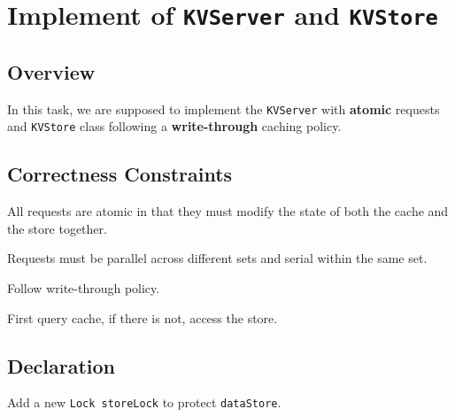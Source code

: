 \documentclass{article}
\begin{document}
\section{Implement of \texttt{KVServer} and \texttt{KVStore}}
\subsection{Overview}
In this task, we are supposed to implement the \texttt{KVServer} with \textbf{atomic} requests
and \texttt{KVStore} class following a \textbf{write-through} caching policy.
\subsection{Correctness Constraints}
\begin{compactitem}
	\item All requests are atomic in that they must modify the state of both the cache and the store together.
	\item Requests must be parallel across different sets and serial within the same set.
	\item Follow write-through policy.
	\item First query cache, if there is not, access the store.
\end{compactitem}
\subsection{Declaration}
Add a new \texttt{Lock storeLock} to protect \texttt{dataStore}.
\end{document}
